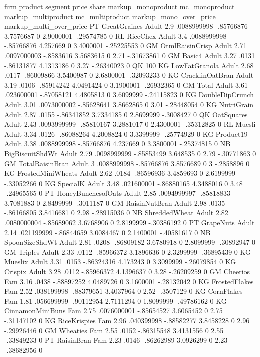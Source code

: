 firm	product	segment	price	share	markup_monoproduct	mc_monoproduct	markup_multiproduct	mc_multiproduct	markup_mono_over_price	markup_multi_over_price
PT	GreatGraines	Adult	2.9	.0088999998	-.85766876	3.7576687	0	2.9000001	-.29574785	0
RL	RiceChex	Adult	3.4	.0088999998	-.85766876	4.257669	0	3.4000001	-.25225553	0
GM	OtmlRaisinCrisp	Adult	2.71	.0097000003	-.8583616	3.5683615	0	2.71	-.31673861	0
GM	Basic4	Adult	3.27	.0131	-.86131877	4.1313186	0	3.27	-.26340023	0
QK	100%
KG	LowFatGranola	Adult	2.68	.0117	-.86009866	3.5400987	0	2.6800001	-.32093233	0
KG	CracklinOatBran	Adult	3.19	.0106	-.85914242	4.0491424	0	3.1900001	-.26932365	0
GM	Total	Adult	3.61	.023600001	-.87058121	4.4805813	0	3.6099999	-.24115823	0
KG	DoubleDipCrunch	Adult	3.01	.0073000002	-.85628641	3.8662865	0	3.01	-.28448054	0
KG	NutriGrain	Adult	2.87	.0155	-.86341852	3.7334185	0	2.8699999	-.3008427	0
QK	OatSquares	Adult	2.43	.0093999999	-.85810167	3.2881017	0	2.4300001	-.35312825	0
RL	Muesli	Adult	3.34	.0126	-.86088264	4.2008824	0	3.3399999	-.25774929	0
KG	Product19	Adult	3.38	.0088999998	-.85766876	4.237669	0	3.3800001	-.25374815	0
NB	BigBiscuitShdWt	Adult	2.79	.0098999999	-.85853499	3.648535	0	2.79	-.30771863	0
GM	TotalRaisinBran	Adult	3	.0088999998	-.85766876	3.8576689	0	3	-.2858896	0
KG	FrostedMiniWheats	Adult	2.62	.0184	-.86596936	3.4859693	0	2.6199999	-.33052266	0
KG	SpecialK	Adult	3.48	.021600001	-.86880165	4.3488016	0	3.48	-.24965565	0
PT	HoneyBunchesofOats	Adult	2.85	.0094999997	-.85818833	3.7081883	0	2.8499999	-.3011187	0
GM	RaisinNutBran	Adult	2.98	.0135	-.86166805	3.8416681	0	2.98	-.28915036	0
NB	ShreddedWheat	Adult	2.82	.0080000004	-.85689062	3.6768906	0	2.8199999	-.30386192	0
PT	GrapeNuts	Adult	2.14	.021199999	-.86844659	3.0084467	0	2.1400001	-.40581617	0
NB	SpoonSizeShdWt	Adult	2.81	.0208	-.86809182	3.6780918	0	2.8099999	-.30892947	0
GM	Triples	Adult	2.33	.0112	-.85966372	3.1896636	0	2.3299999	-.36895439	0
KG	Mueslix	Adult	3.31	.0153	-.86324316	4.173243	0	3.3099999	-.26079854	0
KG	Crispix	Adult	3.28	.0112	-.85966372	4.1396637	0	3.28	-.26209259	0
GM	Cheerios	Fam	3.16	.0438	-.88897252	4.0489726	0	3.1600001	-.28132042	0
KG	FrostedFlakes	Fam	2.52	.038199998	-.88379651	3.4037964	0	2.52	-.3507129	0
KG	CornFlakes	Fam	1.81	.056699999	-.90112954	2.7111294	0	1.8099999	-.49786162	0
KG	CinnamonMiniBuns	Fam	2.75	.0076000001	-.85654527	3.6065452	0	2.75	-.31147102	0
KG	RiceKrispies	Fam	2.96	.040399998	-.88582277	3.8458228	0	2.96	-.29926446	0
GM	Wheaties	Fam	2.55	.0152	-.86315548	3.4131556	0	2.55	-.33849233	0
PT	RaisinBran	Fam	2.23	.0146	-.86262989	3.0926299	0	2.23	-.38682956	0
